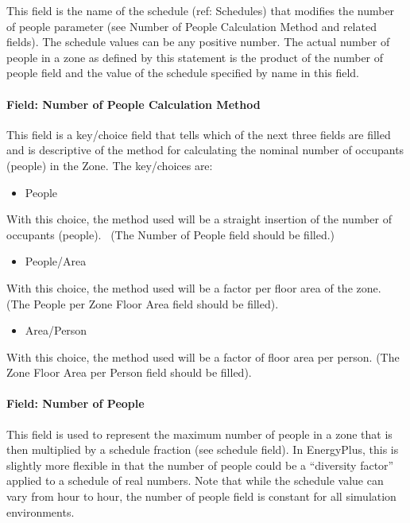 This field is the name of the schedule (ref: Schedules) that modifies the number of people parameter (see Number of People Calculation Method and related fields). The schedule values can be any positive number. The actual number of people in a zone as defined by this statement is the product of the number of people field and the value of the schedule specified by name in this field.

\paragraph{Field: Number of People Calculation Method}\label{field-number-of-people-calculation-method}

This field is a key/choice field that tells which of the next three fields are filled and is descriptive of the method for calculating the nominal number of occupants (people) in the Zone. The key/choices are:

\begin{itemize}
\tightlist
\item
  People
\end{itemize}

With this choice, the method used will be a straight insertion of the number of occupants (people).~ (The Number of People field should be filled.)

\begin{itemize}
\tightlist
\item
  People/Area
\end{itemize}

With this choice, the method used will be a factor per floor area of the zone. (The People per Zone Floor Area field should be filled).

\begin{itemize}
\tightlist
\item
  Area/Person
\end{itemize}

With this choice, the method used will be a factor of floor area per person. (The Zone Floor Area per Person field should be filled).

\paragraph{Field: Number of People}\label{field-number-of-people}

This field is used to represent the maximum number of people in a zone that is then multiplied by a schedule fraction (see schedule field). In EnergyPlus, this is slightly more flexible in that the number of people could be a ``diversity factor'' applied to a schedule of real numbers. Note that while the schedule value can vary from hour to hour, the number of people field is constant for all simulation environments.

